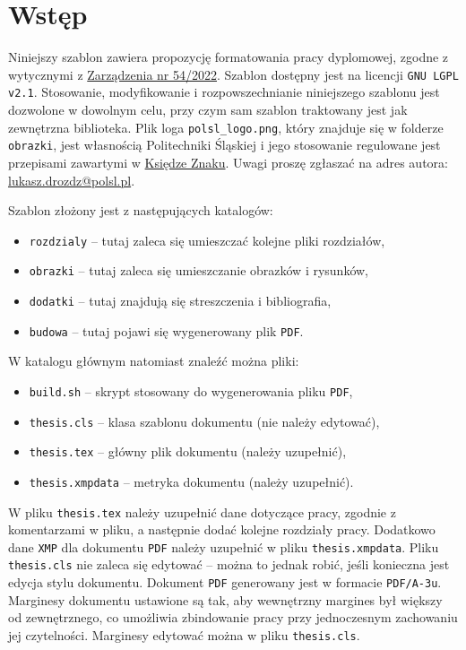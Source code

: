 \chapter{Wstęp}

Niniejszy szablon zawiera propozycję formatowania pracy dyplomowej, zgodne z wytycznymi z \href{https://lex.polsl.pl/423-lista/d/20505/5/}{Zarządzenia nr 54/2022}. Szablon dostępny jest na licencji \texttt{GNU LGPL v2.1}. Stosowanie, modyfikowanie i rozpowszechnianie niniejszego szablonu jest dozwolone w dowolnym celu, przy czym sam szablon traktowany jest jak zewnętrzna biblioteka. Plik loga \verb|polsl_logo.png|, który znajduje się w folderze \texttt{obrazki}, jest własnością Politechniki Śląskiej i jego stosowanie regulowane jest przepisami zawartymi w \href{https://www.polsl.pl/siwps/logo-2/}{Księdze Znaku}. Uwagi proszę zgłaszać na adres autora: \href{mailto:lukasz.drozdz@polsl.pl}{lukasz.drozdz@polsl.pl}.

Szablon złożony jest z następujących katalogów:
\begin{itemize}
\item \texttt{rozdzialy} -- tutaj zaleca się umieszczać kolejne pliki rozdziałów,
\item \texttt{obrazki}   -- tutaj zaleca się umieszczanie obrazków i rysunków,
\item \texttt{dodatki}   -- tutaj znajdują się streszczenia i bibliografia,
\item \texttt{budowa}    -- tutaj pojawi się wygenerowany plik \texttt{PDF}.
\end{itemize}

W katalogu głównym natomiast znaleźć można pliki:
\begin{itemize}
\item \texttt{build.sh}       -- skrypt stosowany do wygenerowania pliku \texttt{PDF},
\item \texttt{thesis.cls}     -- klasa szablonu dokumentu (nie należy edytować),
\item \texttt{thesis.tex}     -- główny plik dokumentu (należy uzupełnić),
\item \texttt{thesis.xmpdata} -- metryka dokumentu (należy uzupełnić).
\end{itemize}

W pliku \texttt{thesis.tex} należy uzupełnić dane dotyczące pracy, zgodnie z komentarzami w pliku, a następnie dodać kolejne rozdziały pracy. Dodatkowo dane \texttt{XMP} dla dokumentu \texttt{PDF} należy uzupełnić w pliku \texttt{thesis.xmpdata}. Pliku \texttt{thesis.cls} nie zaleca się edytować -- można to jednak robić, jeśli konieczna jest edycja stylu dokumentu. Dokument \texttt{PDF} generowany jest w formacie \texttt{PDF/A-3u}. Marginesy dokumentu ustawione są tak, aby wewnętrzny margines był większy od zewnętrznego, co umożliwia zbindowanie pracy przy jednoczesnym zachowaniu jej czytelności. Marginesy edytować można w pliku \texttt{thesis.cls}.
